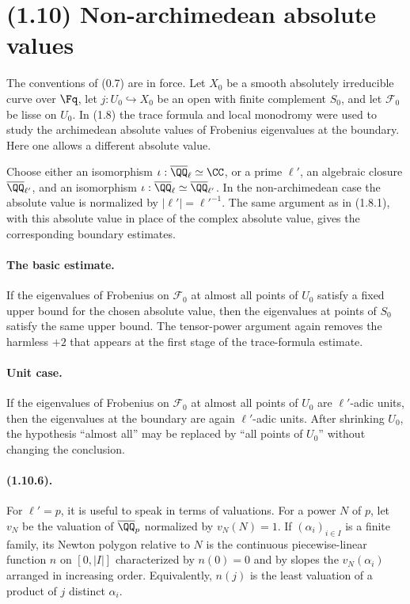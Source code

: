 \section*{(1.10) Non-archimedean absolute values}

The conventions of (0.7) are in force. Let $X_0$ be a smooth absolutely irreducible curve over $\Fq$, let $j:U_0\hookrightarrow X_0$ be an open with finite complement $S_0$, and let $\mathcal F_0$ be lisse on $U_0$. In (1.8) the trace formula and local monodromy were used to study the archimedean absolute values of Frobenius eigenvalues at the boundary. Here one allows a different absolute value.

Choose either an isomorphism $\iota:\overline{\QQ}_\ell\simeq\CC$, or a prime $\ell'$, an algebraic closure $\overline{\QQ}_{\ell'}$, and an isomorphism $\iota:\overline{\QQ}_\ell\simeq\overline{\QQ}_{\ell'}$. In the non-archimedean case the absolute value is normalized by $|\ell'|=\ell'^{-1}$. The same argument as in (1.8.1), with this absolute value in place of the complex absolute value, gives the corresponding boundary estimates.

\paragraph{The basic estimate.}
If the eigenvalues of Frobenius on $\mathcal F_0$ at almost all points of $U_0$ satisfy a fixed upper bound for the chosen absolute value, then the eigenvalues at points of $S_0$ satisfy the same upper bound. The tensor-power argument again removes the harmless $+2$ that appears at the first stage of the trace-formula estimate.

\paragraph{Unit case.}
If the eigenvalues of Frobenius on $\mathcal F_0$ at almost all points of $U_0$ are $\ell'$-adic units, then the eigenvalues at the boundary are again $\ell'$-adic units. After shrinking $U_0$, the hypothesis ``almost all'' may be replaced by ``all points of $U_0$'' without changing the conclusion.

\paragraph{(1.10.6).}
For $\ell'=p$, it is useful to speak in terms of valuations. For a power $N$ of $p$, let $v_N$ be the valuation of $\overline{\QQ}_p$ normalized by $v_N(N)=1$. If $(\alpha_i)_{i\in I}$ is a finite family, its Newton polygon relative to $N$ is the continuous piecewise-linear function $n$ on $[0,|I|]$ characterized by $n(0)=0$ and by slopes the $v_N(\alpha_i)$ arranged in increasing order. Equivalently, $n(j)$ is the least valuation of a product of $j$ distinct $\alpha_i$.

